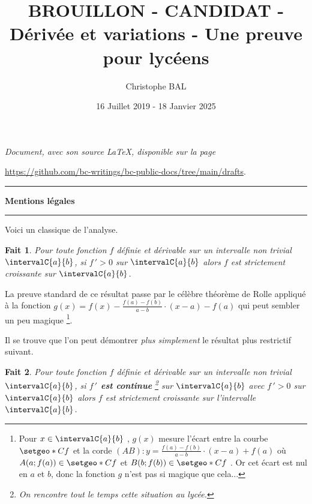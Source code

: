 \documentclass[12pt]{amsart}
\newtheorem{fact}{Fait}
\begin{document}
\title{BROUILLON - CANDIDAT - Dérivée et variations - Une preuve pour lycéens}
\author{Christophe BAL}
\date{16 Juillet 2019 - 18 Janvier 2025}

\maketitle

\begin{center}
	\itshape
	Document, avec son source \LaTeX, disponible sur la page

	\url{https://github.com/bc-writings/bc-public-docs/tree/main/drafts}.
\end{center}


\bigskip


\begin{center}
	\hrule\vspace{.3em}
	{
		\fontsize{1.35em}{1em}\selectfont
		\textbf{Mentions \og légales \fg}
	}

	\vspace{0.45em}
	\doclicenseThis
	\hrule
\end{center}


\vspace{1em}


Voici un classique de l'analyse.


\begin{fact}
	Pour toute fonction $f$ définie et dérivable sur un intervalle non trivial $\intervalC{a}{b}$, si $f\,' > 0$ sur $\intervalC{a}{b}$ alors $f$ est strictement croissante sur $\intervalC{a}{b}$.
\end{fact}

La preuve standard de ce résultat passe par le célèbre théorème de Rolle appliqué à la fonction $g(x) = f(x) - \frac{f(a) - f(b)}{a - b} \cdot (x - a) - f(a)$ qui peut sembler un peu magique
\footnote{
	Pour $x \in \intervalC{a}{b}$ , $g(x)$ mesure l'écart entre la courbe $\setgeo*{C}{f}$ et la corde $(AB) : y = \frac{f(a) - f(b)}{a - b} \cdot (x - a) + f(a)$ où $A(a ; f(a)) \in \setgeo*{C}{f}$ et $B(b ; f(b)) \in \setgeo*{C}{f}$ .
	Or cet écart est nul en $a$ et $b$, donc la fonction $g$ n'est pas si magique que cela...
}.


\bigskip


Il se trouve que l'on peut démontrer \emph{\og plus simplement \fg} le résultat plus restrictif suivant.


\begin{fact}
	Pour toute fonction $f$ définie et dérivable sur un intervalle non trivial $\intervalC{a}{b}$,
	si \textbf{$f\,'$ est continue}
	\footnote{
		On rencontre tout le temps cette situation au lycée.
	}
	sur $\intervalC{a}{b}$ avec $f\,' > 0$ sur $\intervalC{a}{b}$
	alors $f$ est strictement croissante sur l'intervalle $\intervalC{a}{b}$.
\end{fact}
\end{document}
